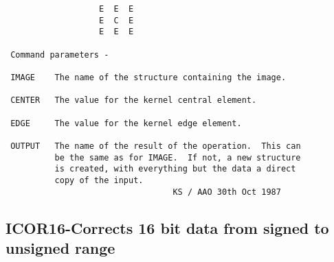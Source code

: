 \begin{description}
\begin{verbatim}
                   E  E  E
                   E  C  E
                   E  E  E

 Command parameters -

 IMAGE    The name of the structure containing the image.

 CENTER   The value for the kernel central element.

 EDGE     The value for the kernel edge element.

 OUTPUT   The name of the result of the operation.  This can
          be the same as for IMAGE.  If not, a new structure
          is created, with everything but the data a direct
          copy of the input.
                                  KS / AAO 30th Oct 1987
\end{verbatim}
\end{description}
\subsection{ICOR16-\label{ICOR16}Corrects 16 bit data from signed to unsigned range}
